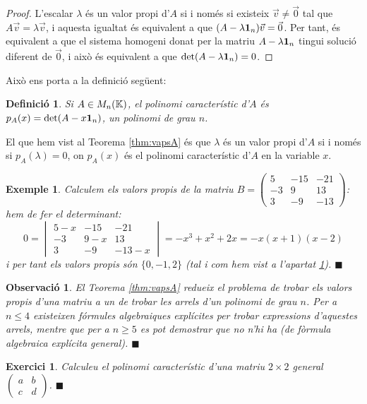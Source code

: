 \documentclass[
  11pt,
]{book}
\numberwithin{dummy}{section}
\theoremstyle{maincolornumbox}
\newtheorem{exerciseT}{Exercici}[chapter]
\newtheorem{remarkT}{Observació}[chapter]
\theoremstyle{blacknumex}
\newtheorem{exampleT}{Exemple}[chapter]
\theoremstyle{blacknumbox}
\newtheorem{definitionT}{Definició}[chapter]
\theoremstyle{maincolornum}
\newenvironment{exercise}{\begin{eBox}\begin{exerciseT}}{\hfill{\color{maincolor}\tiny\ensuremath{\blacksquare}}\end{exerciseT}\end{eBox}}
\newenvironment{definition}{\begin{dBox}\begin{definitionT}}{\end{definitionT}\end{dBox}}
\newenvironment{example}{\begin{exampleT}}{\hfill{\tiny\ensuremath{\blacksquare}}\end{exampleT}}
\newenvironment{remark}{\begin{remarkT}}{\hfill{\tiny\ensuremath{\blacksquare}}\end{remarkT}}
\begin{document}
\begin{proof}
L'escalar \(\lambda\) és un valor propi d'\(A\) si i només si
existeix \(\vec v\neq \vec 0\) tal que \(A\vec v=\lambda \vec v\), i aquesta
igualtat és equivalent a que \((A-\lambda \mathbf{1}_n)\vec v=\vec 0\). Per tant,
és equivalent a que el sistema homogeni donat per la matriu
\(A-\lambda\mathbf{1}_n\) tingui solució diferent de \(\vec 0\), i això és
equivalent a que \(\det(A-\lambda\mathbf{1}_n)=0\).
\end{proof}

Això ens porta a la definició següent:

\begin{definition}
Si \(A\in M_n(\mathbb{K})\), el \emph{polinomi característic d'\(A\)} és
\(p_A(x)=\det(A-x \mathbf{1}_n)\), un polinomi de grau \(n\).
\end{definition}

El que hem vist al Teorema
\ref{thm:vapsA}
és que \(\lambda\) és un valor propi d'\(A\) si i només si \(p_A(\lambda)=0\),
on \(p_A(x)\) és el polinomi característic d'\(A\) en la variable \(x\).

\begin{example}
Calculem els valors propis de la matriu \(B=\left(\begin{smallmatrix} 5 & -15 & -21 \\ -3 & 9 & 13 \\ 3 & -9 & -13 \end{smallmatrix}\right)\): hem de fer el determinant: \[0=
\begin{vmatrix}
5-x & -15 & -21 \\ -3 & 9-x & 13 \\ 3 & -9 & -13-x
\end{vmatrix} = -x^3 +x^2+2x=-x(x+1)(x-2)\] i per tant els valors propis
són \(\{0,-1,2\}\) (tal i com hem vist a l'apartat
\protect\hyperlink{subsec:motiv-diag}{1}).
\end{example}

\begin{remark}
El Teorema \ref{thm:vapsA} redueix el problema de trobar els valors propis
d'una matriu a un de trobar les arrels d'un polinomi de grau \(n\). Per a
\(n\leq 4\) existeixen fórmules algebraiques explícites per trobar
expressions d'aquestes arrels, mentre que per a \(n\geq 5\) es pot
demostrar que no n'hi ha (de fòrmula algebraica explícita general).
\end{remark}

\begin{exercise}
Calculeu el polinomi característic d'una matriu \(2\times 2\) general
\(\left(\begin{smallmatrix}a&b\\c&d\end{smallmatrix} \right)\).
\end{exercise}
\end{document}
